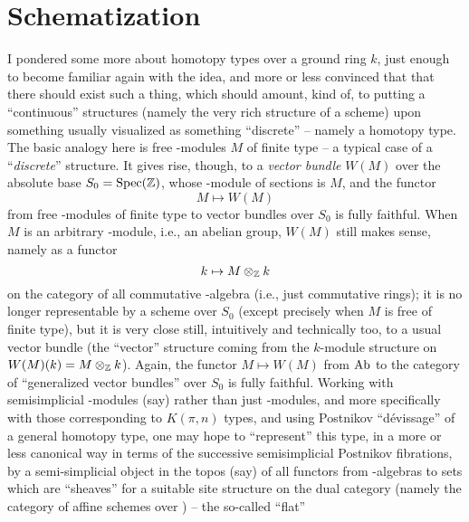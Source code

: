 
\chapter{Schematization}
\label{ch:VI}

\noindent\hfill{}\par

\label{sec:110}%
I pondered some more about homotopy types over a ground ring $k$, just
enough to become familiar again with the idea, and more or less
convinced that that there should exist such a thing, which should
amount, kind of, to putting a ``continuous'' structures (namely the
very rich structure of a scheme) upon something usually visualized as
something ``discrete'' -- namely a homotopy type. The basic analogy
here is free \bZ-modules $M$ of finite type -- a typical case of a
``\emph{discrete}'' structure. It gives rise, though, to a
\emph{vector bundle} $W(M)$ over the absolute base $S_0=\operatorname{Spec}({\mathbb{Z}})$,
whose \bZ-module of sections is $M$, and the functor
\[M\mapsto W(M)\]
from free \bZ-modules of finite type to vector bundles over $S_0$ is
fully faithful. When $M$ is an arbitrary \bZ-module, i.e., an abelian
group, $W(M)$ still makes sense, namely as a functor
\[k\mapsto M\otimes_{\mathbb{Z}} k\]
on the category of all commutative \bZ-algebra (i.e., just commutative
rings); it is no longer representable by a scheme over $S_0$ (except
precisely when $M$ is free of finite type), but it is very close
still, intuitively and technically too, to a usual vector bundle (the
``vector'' structure coming from the $k$-module structure on
$W(M)(k)=M\otimes_{\mathbb{Z}} k$). Again, the functor $M\mapsto W(M)$ from
$\operatorname{Ab}$ to the category of ``generalized vector bundles'' over $S_0$
is fully faithful. Working with semisimplicial \bZ-modules (say)
rather than just \bZ-modules, and more specifically with those
corresponding to $K(\pi,n)$ types, and using Postnikov
``dévissage''
of a general homotopy type, one may hope to ``represent'' this type,
in a more or less canonical way in terms of the successive
semisimplicial Postnikov fibrations, by a semi-simplicial object in
the topos (say) of all functors from \bZ-algebras to sets which are
``sheaves'' for a suitable site structure on the dual category (namely
the category of affine schemes over \bZ) -- the so-called ``flat''
